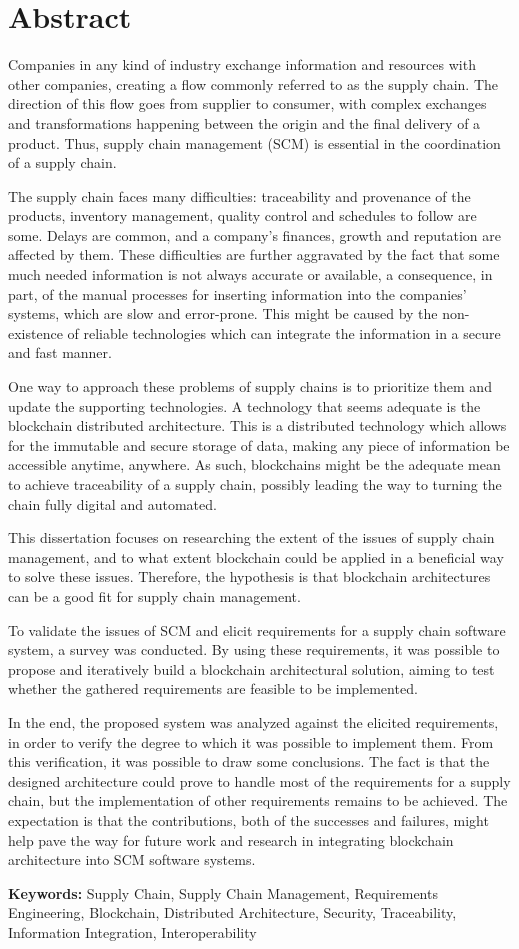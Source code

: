 \chapter{Abstract}
Companies in any kind of industry exchange information and resources with other companies, creating a flow commonly referred to as the supply chain. The direction of this flow goes from supplier to consumer, with complex exchanges and transformations happening between the origin and the final delivery of a product. Thus, supply chain management (SCM) is essential in the coordination of a supply chain.

The supply chain faces many difficulties: traceability and provenance of the products, inventory management, quality control and schedules to follow are some.  Delays are common, and a company's finances, growth and reputation are affected by them. These difficulties are further aggravated by the fact that some much needed information is not always accurate or available, a consequence, in part, of the manual processes for inserting information into the companies' systems, which are slow and error-prone. This might be caused by the non-existence of reliable technologies which can integrate the information in a secure and fast manner.

One way to approach these problems of supply chains is to prioritize them and update the supporting technologies. A technology that seems adequate is the blockchain distributed architecture. This is a distributed technology which allows for the immutable and secure storage of data, making any piece of information be accessible anytime, anywhere. As such, blockchains might be the adequate mean to achieve traceability of a supply chain, possibly leading the way to turning the chain fully digital and automated.

This dissertation focuses on researching the extent of the issues of supply chain management, and to what extent blockchain could be applied in a beneficial way to solve these issues. Therefore, the hypothesis is that blockchain architectures can be a good fit for supply chain management.

To validate the issues of SCM and elicit requirements for a supply chain software system, a survey was conducted. By using these requirements, it was possible to propose and iteratively build a blockchain architectural solution, aiming to test whether the gathered requirements are feasible to be implemented. 

In the end, the proposed system was analyzed against the elicited requirements, in order to verify the degree to which it was possible to implement them. From this verification, it was possible to draw some conclusions. The fact is that the designed architecture could prove to handle most of the requirements for a supply chain, but the implementation of other requirements remains to be achieved. The expectation is that the contributions, both of the successes and failures, might help pave the way for future work and research in integrating blockchain architecture into SCM software systems.

\textbf{Keywords:} Supply Chain, Supply Chain Management, Requirements Engineering, Blockchain, Distributed Architecture, Security, Traceability, Information Integration, Interoperability



